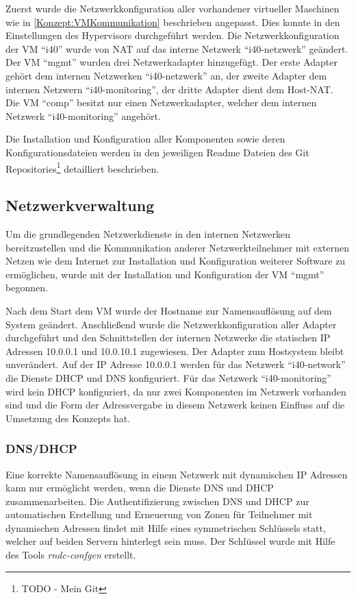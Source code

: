 Zuerst wurde die Netzwerkkonfiguration aller vorhandener virtueller Maschinen wie in \autoref{Konzept:VMKommunikation} beschrieben angepasst. Dies konnte in den Einstellungen des Hypervisors durchgeführt werden. Die Netzwerkkonfiguration der \ac{VM} "`i40"' wurde von \ac{NAT} auf das interne Netzwerk "`i40-netzwerk"' geändert. Der \ac{VM} "`mgmt"' wurden drei Netzwerkadapter hinzugefügt. Der erste Adapter gehört dem internen Netzwerken "`i40-netzwerk"' an, der zweite Adapter dem internen Netzwern "`i40-monitoring"', der dritte Adapter dient dem Host-\ac{NAT}. Die \ac{VM} "`comp"' besitzt nur einen Netzwerkadapter, welcher dem internen Netzwerk "`i40-monitoring"' angehört.

Die Installation und Konfiguration aller Komponenten sowie deren Konfigurationsdateien werden in den jeweiligen Readme Dateien des Git Repositories\footnote{TODO - Mein Git} detailliert beschrieben.

\subsection{Netzwerkverwaltung}
\label{Umsetzung:Netzwerkverwaltung}
Um die grundlegenden Netzwerkdienste in den internen Netzwerken bereitzustellen und die Kommunikation anderer Netzwerkteilnehmer mit externen Netzen wie dem Internet zur Installation und Konfiguration weiterer Software zu ermöglichen, wurde mit der Installation und Konfiguration der \ac{VM} "`mgmt"' begonnen.

Nach dem Start dem \ac{VM} wurde der Hostname zur Namensauflösung auf dem System geändert. Anschließend wurde die Netzwerkkonfiguration aller Adapter durchgeführt und den Schnittstellen der internen Netzwerke die statischen \ac{IP} Adressen 10.0.0.1 und 10.0.10.1 zugewiesen. Der Adapter zum Hostsystem bleibt unverändert. Auf der \ac{IP} Adresse 10.0.0.1 werden für das Netzwerk "`i40-network"' die Dienste \ac{DHCP} und \ac{DNS} konfiguriert. Für das Netzwerk "`i40-monitoring"' wird kein \ac{DHCP} konfiguriert, da nur zwei Komponenten im Netzwerk vorhanden sind und die Form der Adressvergabe in diesem Netzwerk keinen Einfluss auf die Umsetzung des Konzepts hat. 

\subsubsection{\ac{DNS}/\ac{DHCP}}
Eine korrekte Namensauflösung in einem Netzwerk mit dynamischen \ac{IP} Adressen kann nur ermöglicht werden, wenn die Dienste \ac{DNS} und \ac{DHCP} zusammenarbeiten. Die Authentifizierung zwischen \ac{DNS} und \ac{DHCP} zur automatischen Erstellung und Erneuerung von Zonen für Teilnehmer mit dynamischen Adressen findet mit Hilfe eines symmetrischen Schlüssels statt, welcher auf beiden Servern hinterlegt sein muss. Der Schlüssel wurde mit Hilfe des Tools \textit{rndc-confgen} erstellt.

